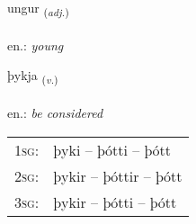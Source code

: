 \documentclass[frontgrid, backgrid]{flacards}\usepackage[]{graphicx}\usepackage[]{xcolor}
\begin{document}
\renewcommand{\blhead}{\vskip5pt {\small\bfseries\footnotesize Lýsingarorð | Adjective }}
\renewcommand{\bcfoot}{\vskip5pt \hspace{2pt}{\small\bfseries\footnotesize 1K}}


{ungur \small{\textsubscript{(\textit{adj.})}} \\[1ex] %
\textphonetic{[uŋkʏr]} \\
en.: \emph{young} \\  [2ex]
\renewcommand*{\arraystretch}{0.8}
}

\renewcommand{\flhead}{\vskip5pt \fboxsep=0pt {\small\bfseries\footnotesize Sagnorð | Verb}}
\renewcommand{\fcfoot}{\vskip5pt \fboxsep=0pt \hspace{2pt}{\small\bfseries\footnotesize 1K}}

\renewcommand{\blhead}{\vskip5pt {\small\bfseries\footnotesize Sagnorð | Verb }}
\renewcommand{\bcfoot}{\vskip5pt \hspace{2pt}{\small\bfseries\footnotesize 1K}}


{þykja \small{\textsubscript{(\textit{v.})}} \\[1ex] %
\textphonetic{[θɪːca]} \\
en.: \emph{be considered} \\  [2ex]
\renewcommand*{\arraystretch}{0.8}
\begin{tabular}{p{1cm}l}
\textsc{1sg}: & þyki -- þótti -- þótt \\ 
\textsc{2sg}: & þykir -- þóttir -- þótt \\ 
\textsc{3sg}: & þykir -- þótti -- þótt \\ 
\end{tabular}
}
\end{document}
